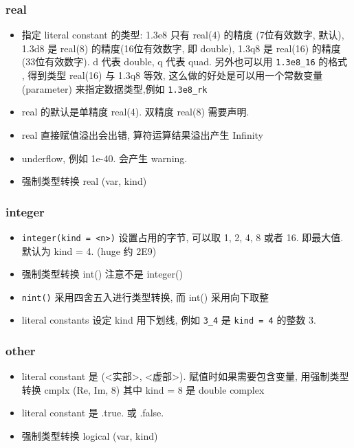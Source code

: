 \subsubsection{real}
\begin{itemize}
\item 指定 literal constant 的类型: 1.3e8 只有 real(4) 的精度 (7位有效数字, 默认), 1.3d8 是 real(8) 的精度(16位有效数字, 即 double), 1.3q8 是 real(16) 的精度(33位有效数字). d 代表 double, q 代表 quad. 另外也可以用 \verb|1.3e8_16| 的格式 , 得到类型  real(16) 与 1.3q8 等效, 这么做的好处是可以用一个常数变量 (parameter) 来指定数据类型,例如 \verb|1.3e8_rk|
\item real 的默认是单精度 real(4). 双精度 real(8) 需要声明.
\item real 直接赋值溢出会出错, 算符运算结果溢出产生 Infinity
\item underflow, 例如 1e-40. 会产生 warning.
\item 强制类型转换 real (var, kind)
\end{itemize}

\subsubsection{integer}
\begin{itemize}
\item \verb`integer(kind = <n>)` 设置占用的字节, 可以取 1, 2, 4, 8 或者 16. 即最大值. 默认为 
   kind = 4. (huge 约 2E9)
\item 强制类型转换 int() 注意不是 integer()
\item \verb`nint()` 采用四舍五入进行类型转换, 而 int() 采用向下取整
\item literal constants 设定 kind 用下划线, 例如 \verb`3_4` 是 \verb`kind = 4` 的整数 3.
\end{itemize}

\subsubsection{other}
\begin{itemize}
\item literal constant 是 (<实部>, <虚部>). 赋值时如果需要包含变量, 用强制类型转换 cmplx (Re, Im, 8) 其中 kind = 8 是 double complex
\item literal constant 是 .true. 或 .false.
\item 强制类型转换 logical (var, kind)
\end{itemize}

